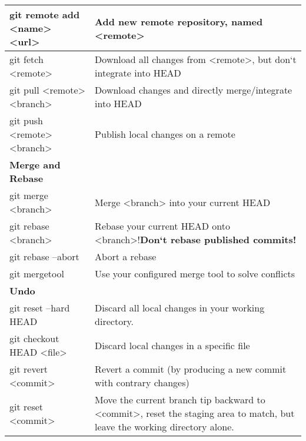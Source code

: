 \begin{longtable}{| p{} | p{} |}
    git remote add <name> <url>& 
    Add new remote repository, named <remote>
    \\ \hline 
    
    git fetch <remote>&  
    Download all changes from <remote>,
    but don‘t integrate into HEAD
    \\ \hline
    
    git pull <remote> <branch>&
    Download changes and directly merge/integrate into HEAD  
    \\ \hline 
    
    git push <remote> <branch>&
    Publish local changes on a remote
    \\ \hline \hline
       
   \textbf{ Merge and Rebase}&
    \\\hline 
    
    \hline
    git merge <branch>&
    Merge <branch> into your current HEAD
    \\ \hline 
    
    git rebase <branch>& 
    Rebase your current HEAD onto <branch>!\textbf{Don‘t rebase published commits!}
    \\ \hline 
    
    git rebase --abort&
    Abort a rebase
    \\ \hline 
    
    git mergetool& 
    Use your configured merge tool to solve conflicts
    \\ \hline \hline
   
    \textbf{Undo}&
    \\\hline 

    \hline
    git reset --hard HEAD&
    Discard all local changes in your working directory.
    \\ \hline  
    
    git checkout HEAD <file>&
    Discard local changes in a specific file
    \\ \hline   
    
    git revert <commit>&
    Revert a commit (by producing a new commit with contrary changes)
    \\ \hline    
    
    git reset <commit>&
    Move the current branch tip backward to <commit>, reset the staging area to match, but leave the working directory alone. 
    \\ \hline
\end{longtable}

